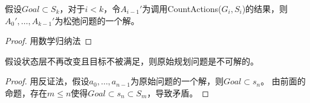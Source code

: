 \begin{theorem}
假设$Goal\subset S_k$，对于$i<k$，令$A_{i-1}'$为调用CountActions($G_i,S_i$)的结果，则$A_0',\ldots,A_{k-1}'$为松弛问题的一个解。
\end{theorem}
\begin{proof}
用数学归纳法
\end{proof}

\begin{theorem}
假设状态层不再改变且目标不被满足，则原始规划问题是不可解的。
\end{theorem}
\begin{proof}
用反证法，假设$a_0,\ldots,a_{n-1}$为原始问题的一个解，则$Goal\subset s_n$。
由前面的命题，存在$m\leq n$使得$Goal\subset s_n\subset S_m$，导致矛盾。
\end{proof}